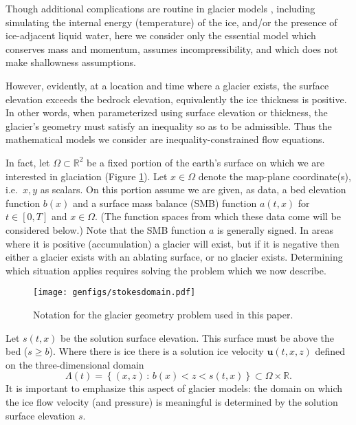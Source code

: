 \documentclass[hidelinks,onefignum,onetabnum,final]{siamart220329}  %
\newcommand{\RR}{\mathbb{R}}
\newcommand{\bu}{\mathbf{u}}
\begin{document}
Though additional complications are routine in glacier models \cite{GreveBlatter2009}, including simulating the internal energy (temperature) of the ice, and/or the presence of ice-adjacent liquid water, here we consider only the essential model which conserves mass and momentum, assumes incompressibility, and which does not make shallowness assumptions.

However, evidently, at a location and time where a glacier exists, the surface elevation exceeds the bedrock elevation, equivalently the ice thickness is positive.  In other words, when parameterized using surface elevation or thickness, the glacier's geometry must satisfy an inequality so as to be admissible.  Thus the mathematical models we consider are inequality-constrained flow equations.

In fact, let $\Omega \subset \RR^2$ be a fixed portion of the earth's surface on which we are interested in glaciation (Figure \ref{fig:stokesdomain}).  Let $x\in\Omega$ denote the map-plane coordinate(s), i.e.~$x,y$ as scalars.  On this portion assume we are given, as data, a bed elevation function $b(x)$ and a surface mass balance (SMB) function $a(t,x)$ for $t\in [0,T]$ and $x\in \Omega$.  (The function spaces from which these data come will be considered below.)  Note that the SMB function $a$ is generally signed.  In areas where it is positive (accumulation) a glacier will exist, but if it is negative then either a glacier exists with an ablating surface, or no glacier exists.  Determining which situation applies requires solving the problem which we now describe.

\begin{figure}[ht]
\centering
\texttt{[image: genfigs/stokesdomain.pdf]}
\caption{Notation for the glacier geometry problem used in this paper.}
\label{fig:stokesdomain}
\end{figure}

Let $s(t,x)$ be the solution surface elevation.  This surface must be above the bed ($s\ge b$).  Where there is ice there is a solution ice velocity $\bu(t,x,z)$ defined on the three-dimensional domain
\begin{equation}
\Lambda(t) = \left\{(x,z)\,:\,b(x) < z < s(t,x)\right\} \subset \Omega \times \RR. \label{eq:icydomain}
\end{equation}
It is important to emphasize this aspect of glacier models: the domain on which the ice flow velocity (and pressure) is meaningful is determined by the solution surface elevation $s$.
\end{document}

